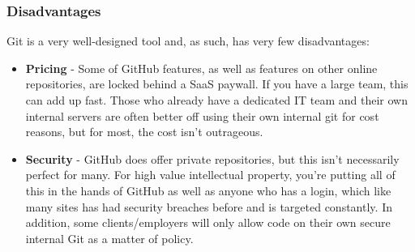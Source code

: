 \newpage
\subsubsection{Disadvantages}
Git is a very well-designed tool and, as such, has very few disadvantages:

\begin{itemize}
    \item \textbf{Pricing} - Some of GitHub features, as well as features on 
    other online repositories, are locked behind a SaaS paywall. If you have a 
    large team, this can add up fast. Those who already have a dedicated IT team
    and their own internal servers are often better off using their own internal
    git for cost reasons, but for most, the cost isn’t outrageous.
    \item \textbf{Security} - GitHub does offer private repositories, but this
    isn’t necessarily perfect for many. For high value intellectual property, 
    you’re putting all of this in the hands of GitHub as well as anyone who has 
    a login, which like many sites has had security breaches before and is 
    targeted constantly. In addition, some clients/employers will only allow 
    code on their own secure internal Git as a matter of policy.
\end{itemize}